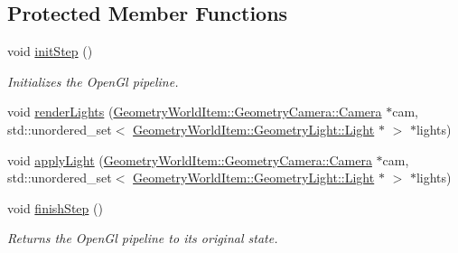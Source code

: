 \subsection*{Protected Member Functions}
\begin{DoxyCompactItemize}
\item 
\mbox{\label{class_geometry_engine_1_1_geometry_render_step_1_1_lighting_pass_aaab2ea74a9710f22887c266af1985490}} 
void \mbox{\hyperlink{class_geometry_engine_1_1_geometry_render_step_1_1_lighting_pass_aaab2ea74a9710f22887c266af1985490}{init\+Step}} ()
\begin{DoxyCompactList}\small\item\em Initializes the Open\+Gl pipeline. \end{DoxyCompactList}\item 
void \mbox{\hyperlink{class_geometry_engine_1_1_geometry_render_step_1_1_lighting_pass_a437ff10a7ef9e7529a4852389a5cf871}{render\+Lights}} (\mbox{\hyperlink{class_geometry_engine_1_1_geometry_world_item_1_1_geometry_camera_1_1_camera}{Geometry\+World\+Item\+::\+Geometry\+Camera\+::\+Camera}} $\ast$cam, std\+::unordered\+\_\+set$<$ \mbox{\hyperlink{class_geometry_engine_1_1_geometry_world_item_1_1_geometry_light_1_1_light}{Geometry\+World\+Item\+::\+Geometry\+Light\+::\+Light}} $\ast$ $>$ $\ast$lights)
\item 
void \mbox{\hyperlink{class_geometry_engine_1_1_geometry_render_step_1_1_lighting_pass_a9d0a0f3b9d52036b9d4f9fbee353cd10}{apply\+Light}} (\mbox{\hyperlink{class_geometry_engine_1_1_geometry_world_item_1_1_geometry_camera_1_1_camera}{Geometry\+World\+Item\+::\+Geometry\+Camera\+::\+Camera}} $\ast$cam, std\+::unordered\+\_\+set$<$ \mbox{\hyperlink{class_geometry_engine_1_1_geometry_world_item_1_1_geometry_light_1_1_light}{Geometry\+World\+Item\+::\+Geometry\+Light\+::\+Light}} $\ast$ $>$ $\ast$lights)
\item 
\mbox{\label{class_geometry_engine_1_1_geometry_render_step_1_1_lighting_pass_a980473c9d2e2e77ebdce9e56454f3d3f}} 
void \mbox{\hyperlink{class_geometry_engine_1_1_geometry_render_step_1_1_lighting_pass_a980473c9d2e2e77ebdce9e56454f3d3f}{finish\+Step}} ()
\begin{DoxyCompactList}\small\item\em Returns the Open\+Gl pipeline to its original state. \end{DoxyCompactList}\item 

\end{DoxyCompactItemize}
